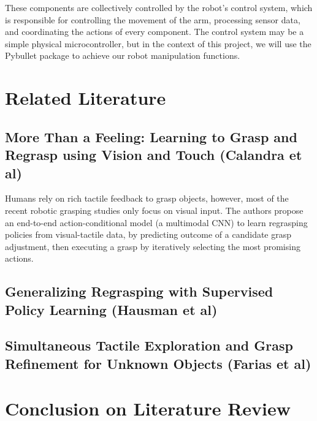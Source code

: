 \documentclass[11pt, a4paper]{report}
\theoremstyle{definition}
\begin{document}
These components are collectively controlled by the robot's control system, which is responsible for controlling the movement of the arm, processing sensor data, and coordinating the actions of every component. The control system may be a simple physical microcontroller, but in the context of this project, we will use the Pybullet \cite{pybullet} package to achieve our robot manipulation functions.

\section{Related Literature}
\label{sec:2.3}


\subsection{More Than a Feeling: Learning to Grasp and Regrasp using Vision and Touch (Calandra et al)\cite{calandra}}
\label{sec:2.3.1}
Humans rely on rich tactile feedback to grasp objects, however, most of the recent robotic grasping studies only focus on visual input. The authors propose an end-to-end action-conditional model (a multimodal CNN) to learn regrasping policies from visual-tactile data, by predicting outcome of a candidate grasp adjustment, then executing a grasp by iteratively selecting the most promising actions\cite{calandra}.


\subsection{Generalizing Regrasping with Supervised Policy Learning (Hausman et al)\cite{hausman}}
\label{sec:2.3.2}


\subsection{Simultaneous Tactile Exploration and Grasp Refinement for Unknown Objects (Farias et al)\cite{farias}}
\label{sec:2.3.3}


\section{Conclusion on Literature Review}
\label{sec:2.4}


\end{document}
